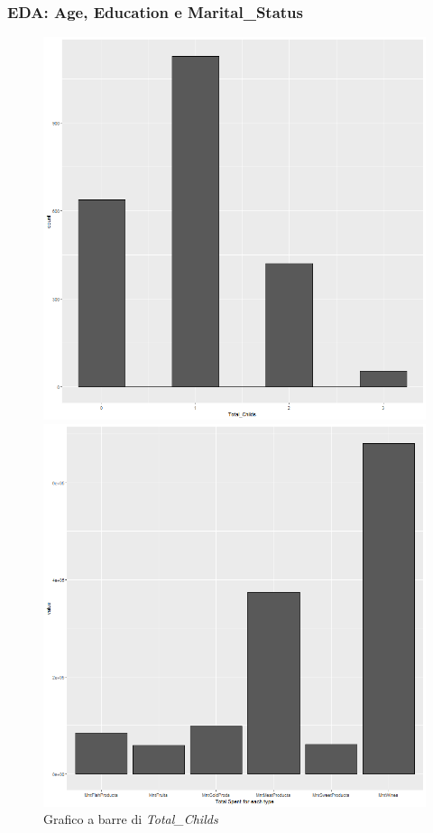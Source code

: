 \begin{frame}[fragile]
\frametitle{EDA: Age, Education  e Marital\_Status}
\begin{figure}[!htb]
  \includegraphics[width=\linewidth]{Img/eda/EDA009.png}
  \caption{Grafico a barre di \textit{Total\_Childs}}\label{fig:BarPlotTc}
\endminipage\hfill
{}
  \includegraphics[width=\linewidth]{Img/eda/EDA017.png}

\end{figure}
\end{frame}
